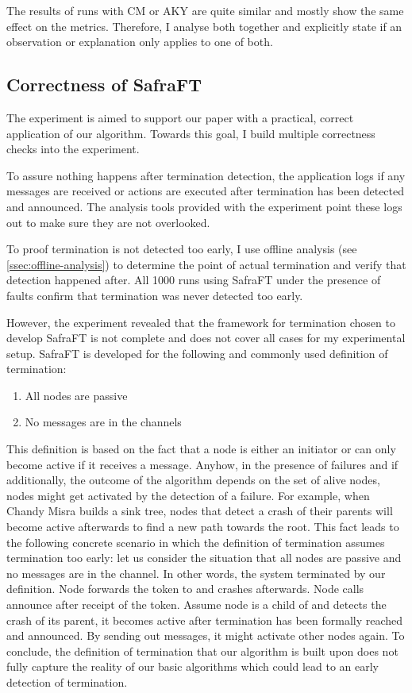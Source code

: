 The results of runs with CM or AKY are quite similar and mostly show the same effect on the metrics.
Therefore, I analyse both together and explicitly state if an observation or explanation only applies to one of both.

\subsection{Correctness of SafraFT}
\label{ssec:correctness}
The experiment is aimed to support our paper with a practical, correct application of our algorithm.
Towards this goal, I build multiple correctness checks into the experiment.

To assure nothing happens after termination detection, the application logs if any messages are received or actions are executed after termination has been detected and announced.
The analysis tools provided with the experiment point these logs out to make sure they are not overlooked.

To proof termination is not detected too early, I use offline analysis (see \cref{ssec:offline-analysis}) to determine the point of actual termination and verify that detection happened after.
All 1000 runs using SafraFT under the presence of faults confirm that termination was never detected too early.

However, the experiment revealed that the framework for termination chosen to develop SafraFT is not complete and does not cover all cases for my experimental setup.
SafraFT is developed for the following and commonly used definition of termination:
\begin{enumerate}
	\item All nodes are passive
	\item No messages are in the channels
\end{enumerate}
This definition is based on the fact that a node is either an initiator or can only become active if it receives a message.
Anyhow, in the presence of failures and if additionally, the outcome of the algorithm depends on the set of alive nodes, nodes might get activated by the detection of a failure.
For example, when Chandy Misra builds a sink tree, nodes that detect a crash of their parents will become active afterwards to find a new path towards the root.
This fact leads to the following concrete scenario in which the definition of termination assumes termination too early: let us consider the situation that all nodes are passive and no messages are in the channel.
In other words, the system terminated by our definition.
Node  forwards the token to  and crashes afterwards.
Node  calls announce after receipt of the token.
Assume node  is a child of  and detects the crash of its parent, it becomes active after termination has been formally reached and announced.
By sending out  messages, it might activate other nodes again.
To conclude, the definition of termination that our algorithm is built upon does not fully capture the reality of our basic algorithms which could lead to an early detection of termination.

